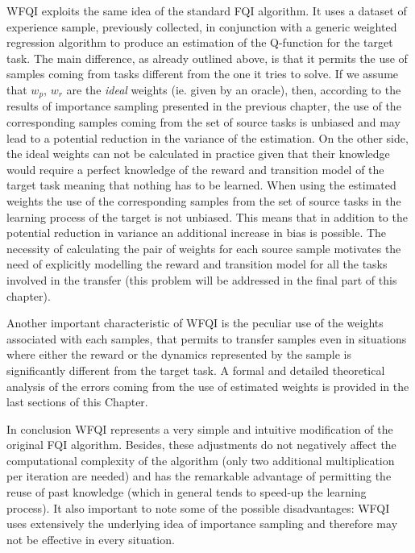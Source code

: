     \noindent WFQI exploits the same idea of the standard FQI algorithm. It uses a dataset of experience
    sample, previously collected, in conjunction with a generic weighted regression algorithm to produce an estimation
    of the Q-function for the target task. The main difference, as already outlined above, is that it permits
    the use of samples coming from tasks different from the one it tries to solve.\newline
    If we assume that $w_p$, $w_r$ are the \textit{ideal} weights (ie. given by an oracle),
    then, according to the results of importance sampling presented in the previous chapter, the use of
    the corresponding samples coming from the set of source tasks is unbiased and may lead to a potential
    reduction in the variance of the estimation.\newline
    On the other side, the ideal weights can not be calculated in practice given that their knowledge would
    require a perfect knowledge of the reward and transition model of the target task meaning that nothing has to
    be learned. When using the estimated weights the use of the corresponding samples from the set of source tasks in
    the learning process of the target is not unbiased. This means that in addition to the potential reduction in
    variance an additional increase in bias is possible.\newline
    The necessity of calculating the pair of weights for each source sample motivates the need of explicitly modelling
    the reward and transition model for all the tasks involved in the transfer (this problem will be addressed in the
    final part of this chapter).

    \noindent Another important characteristic of WFQI is the peculiar use of the weights associated with each
    samples, that permits to transfer samples even in situations where either the reward or the dynamics
    represented by the sample is significantly different from the target task.
    \noindent A formal and detailed theoretical analysis of the errors coming from the use of estimated weights
    is provided in the last sections of this Chapter.\newline

    \noindent In conclusion WFQI represents a very simple and intuitive modification of
    the original FQI algorithm. Besides, these adjustments do not negatively affect the computational
    complexity of the algorithm (only two additional multiplication per iteration are needed) and
    has the remarkable advantage of permitting the reuse of past knowledge (which in general tends to speed-up the learning process).\newline
    It also important to note some of the possible disadvantages: WFQI uses extensively the underlying idea
    of importance sampling and therefore may not be effective in every situation.

